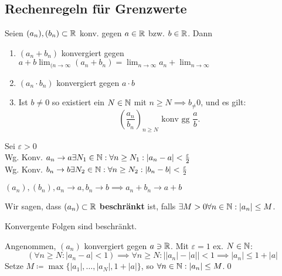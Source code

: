\subsection{Rechenregeln für Grenzwerte}
\begin{subtheorem}
	Seien $ (a_n), (b_n) \subset \mathbb{R} $ konv. gegen $ a \in \mathbb{R} $ bzw. $ b \in \mathbb{R} $. Dann
	\begin{enumerate}[label=(\roman*)]
		\item $ (a_n+b_n) $ konvergiert gegen $ a+ b \lim_{(n\to\infty} ( a_n + b_n ) = \lim_{n\to\infty}a_n + \lim_{n\to\infty} $
		\item $(a_n\cdot b_n) $ konvergiert gegen $ a\cdot b$
		\item Ist $ b\neq 0 $ so existiert ein $ N \in \mathbb{N} $ mit $ n \geq N \implies b_ \neq 0 $, und es gilt:
			\[ \left( \frac{a_n}{b_n} \right)_{n\geq N} \text{ konv gg } \frac{a}{b}. \]
	\end{enumerate}
\end{subtheorem}
\begin{subproof*}
	Sei $ \varepsilon > 0 $\\
	Wg. Konv. $ a_n \to a \exists N_1 \in \mathbb{N} : \forall n \geq N_1 : | a_n - a| < \frac{\varepsilon}{2} $\\
	Wg. Konv. $ b_n \to b \exists N_2 \in \mathbb{N}: \forall n \geq N_2 : | b_n - b | < \frac{\varepsilon}{2} $
\end{subproof*}

$ (a_n), (b_n), a_n \to a, b_n \to b \implies a_n + b_n \to a + b $
\begin{subdefinition}
	Wir sagen, dass $ (a_n) \subset \mathbb{R} $ \textbf{beschränkt} ist, falls $ \exists M > 0 \forall n \in \mathbb{N} : | a_n | \leq M $.
\end{subdefinition}
\begin{sublemma}
	Konvergente Folgen sind beschränkt.
	\begin{subproof*}
		Angenommen, $ (a_n) $ konvergiert gegen $ a \ni \mathbb{R} $. Mit $ \varepsilon = 1 $ ex. $N \in \mathbb{N}$:
		\[ ( \forall n \geq N : | a_n - a | < 1 ) \implies \forall n \geq N : \left| |a_n| - |a| \right| < 1 \implies | a_n | \leq 1 + |a| \]
		Setze $ M \coloneqq \max\{|a_1|, \dotsc, |a_N|, 1 + |a|\}$, so $ \forall n \in \mathbb{N} : | a_n | \leq M $.\qed
	\end{subproof*}
\end{sublemma}

